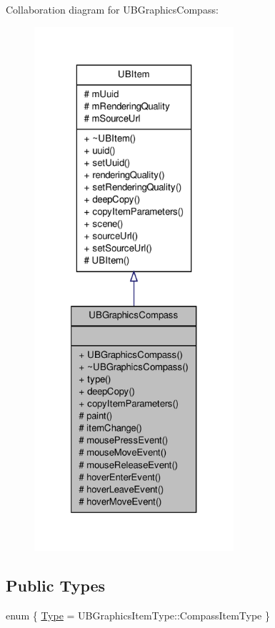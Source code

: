 Collaboration diagram for U\-B\-Graphics\-Compass\-:
\nopagebreak
\begin{figure}[H]
\begin{center}
\leavevmode
\includegraphics[height=550pt]{d8/dee/class_u_b_graphics_compass__coll__graph}
\end{center}
\end{figure}
\subsection*{Public Types}
\begin{DoxyCompactItemize}
\item 
enum \{ \hyperlink{class_u_b_graphics_compass_a50616d0d5cabf43accda398a5c43a48da40b976067d322eb3d65fce74d9af0761}{Type} =  U\-B\-Graphics\-Item\-Type\-:\-:Compass\-Item\-Type
 \}
\end{DoxyCompactItemize}
